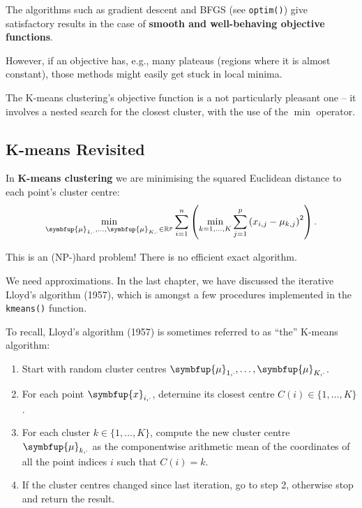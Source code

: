 \documentclass[10pt,b5paper,krantz1]{krantz}
\renewcommand{\mathbf}[1]{\symbfup{#1}}
\renewcommand{\boldsymbol}[1]{\symbfup{#1}}
\begin{document}
The algorithms such as gradient descent and BFGS (see \texttt{optim()})
give satisfactory results in the case of \textbf{smooth and well-behaving objective functions}.

However, if an objective has, e.g., many plateaus (regions where it is almost constant),
those methods might easily get stuck in local minima.

The K-means clustering's objective function is a not particularly pleasant
one -- it involves a nested search for the closest cluster, with the use of the \(\min\) operator.

\hypertarget{k-means-revisited}{%
\subsection{K-means Revisited}\label{k-means-revisited}}

In \textbf{K-means clustering} we are minimising the squared Euclidean distance
to each point's cluster centre:
\[
\min_{\boldsymbol\mu_{1,\cdot}, \dots, \boldsymbol\mu_{K,\cdot} \in \mathbb{R}^p}
\sum_{i=1}^n \left(
\min_{k=1,\dots,K}
\sum_{j=1}^p \left(x_{i,j}-\mu_{k,j}\right)^2
\right).
\]

This is an (NP-)hard problem!
There is no efficient exact algorithm.

We need approximations. In the last chapter, we have
discussed the iterative Lloyd's algorithm (1957),
which is amongst a few procedures implemented in the \texttt{kmeans()} function.

To recall, Lloyd's algorithm (1957) is sometimes referred to as ``the'' K-means algorithm:

\begin{enumerate}
\def\labelenumi{\arabic{enumi}.}
\item
  Start with random cluster centres \(\boldsymbol\mu_{1,\cdot}, \dots, \boldsymbol\mu_{K,\cdot}\).
\item
  For each point \(\mathbf{x}_{i,\cdot}\), determine its closest centre \(C(i)\in\{1,\dots,K\}\).
\item
  For each cluster \(k\in\{1,\dots,K\}\), compute the new cluster centre \(\boldsymbol\mu_{k,\cdot}\) as the componentwise arithmetic mean
  of the coordinates of all the point indices \(i\) such that \(C(i)=k\).
\item
  If the cluster centres changed since last iteration, go to step 2, otherwise stop and return the result.
\end{enumerate}

~\\
\end{document}
